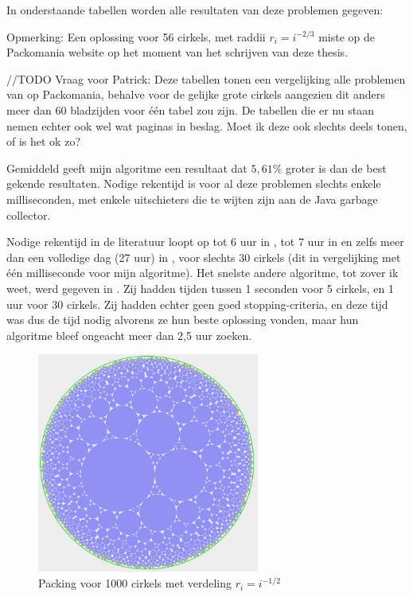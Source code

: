 \documentclass[12pt,a4paper,oneside]{book}
\begin{document}
In onderstaande tabellen worden alle resultaten van deze problemen gegeven:






Opmerking: Een oplossing voor 56 cirkels, met raddii $r_i=i^{-2/3}$ miste op de Packomania website op het moment van het schrijven van deze thesis.

//TODO Vraag voor Patrick: Deze tabellen tonen een vergelijking alle problemen van op Packomania, behalve voor de gelijke grote cirkels aangezien dit anders meer dan 60 bladzijden voor één tabel zou zijn. De tabellen die er nu staan nemen echter ook wel wat paginas in beslag. Moet ik deze ook slechts deels tonen, of is het ok zo?

Gemiddeld geeft mijn algoritme een resultaat dat $5,61\%$ groter is dan de best gekende resultaten.
Nodige rekentijd is voor al deze problemen slechts enkele milliseconden, met enkele uitschieters die te wijten zijn aan de Java garbage collector.

Nodige rekentijd in de literatuur loopt op tot 6 uur in \cite{jors2011}, tot 7 uur in \cite{lopez2013packing} en zelfs meer dan een volledige dag (27 uur) in \cite{zeng2016iterated}, voor slechts 30 cirkels (dit in vergelijking met één milliseconde voor mijn algoritme).
Het snelste andere algoritme, tot zover ik weet, werd gegeven in \cite{ye2013iterated}.
Zij hadden tijden tussen 1 seconden voor 5 cirkels, en 1 uur voor 30 cirkels.
Zij hadden echter geen goed stopping-criteria, en deze tijd was dus de tijd nodig alvorens ze hun beste oplossing vonden, maar hun algoritme bleef ongeacht meer dan 2,5 uur zoeken.

\begin{figure}
  \centering
  \includegraphics[width=0.65\textwidth]{packing-neg1div2-1000.png}
  \caption{Packing voor 1000 cirkels met verdeling $r_i=i^{-1/2}$} \label{fig:packing-neg1div2-1000} 
\end{figure}
\end{document}
